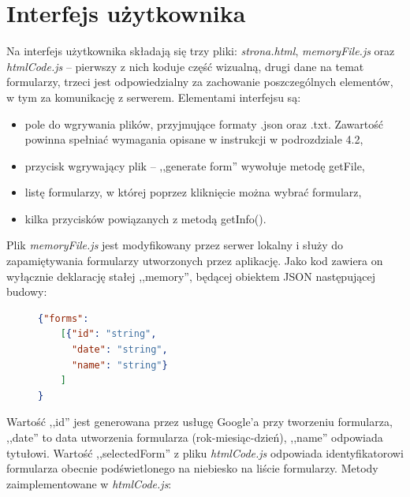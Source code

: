 \section{Interfejs użytkownika}
Na interfejs użytkownika składają się trzy pliki: \textit{strona.html}, \textit{memoryFile.js} oraz \textit{htmlCode.js} -- pierwszy z nich koduje część wizualną, drugi dane na temat formularzy, trzeci jest odpowiedzialny za zachowanie poszczególnych elementów, w tym za komunikację z serwerem. 
\ind Elementami interfejsu są:
\begin{itemize}
\item pole do wgrywania plików, przyjmujące formaty .json oraz .txt. Zawartość powinna spełniać wymagania opisane w instrukcji w podrozdziale 4.2, %
\item przycisk wgrywający plik -- ,,generate form'' wywołuje metodę getFile,
\item listę formularzy, w której poprzez kliknięcie można wybrać formularz,
\item kilka przycisków powiązanych z metodą getInfo().
\end{itemize}
\ind Plik \textit{memoryFile.js} jest modyfikowany przez serwer lokalny i służy do zapamiętywania formularzy utworzonych przez aplikację. Jako kod zawiera on wyłącznie deklarację stałej ,,memory'', będącej obiektem JSON następującej budowy:
\begin{figure}[H]
\begin{lstlisting}[language=json,firstnumber=1]
{"forms":
    [{"id": "string",
      "date": "string",
      "name": "string"}
    ]
}
\end{lstlisting}
\end{figure}
Wartość ,,id'' jest generowana przez usługę Google'a przy tworzeniu formularza, ,,date'' to data utworzenia formularza (rok-miesiąc-dzień), ,,name'' odpowiada tytułowi.
\ind Wartość ,,selectedForm'' z pliku \textit{htmlCode.js} odpowiada identyfikatorowi formularza obecnie podświetlonego na niebiesko na liście formularzy. Metody zaimplementowane w \textit{htmlCode.js}:
